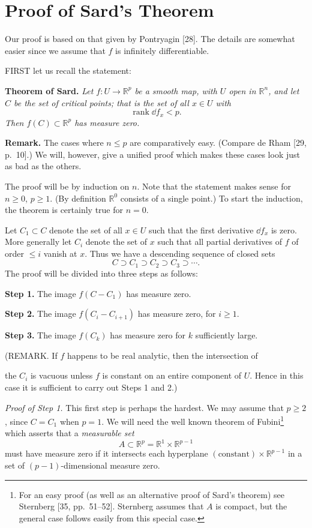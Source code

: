 
\section{Proof of Sard's Theorem}

Our proof is based on that given by Pontryagin [28]. The details are somewhat easier since we assume that $f$ is infinitely differentiable.

FIRST let us recall the statement:

\noindent\textbf{Theorem of Sard.} \textit{Let $f : U \to \mathbb{R}^p$ be a smooth map, with $U$ open in $\mathbb{R}^n$, and let $C$ be the set of critical points; that is the set of all $x \in U$ with}
\[
\operatorname{rank} \dd f_x < p.
\]
\textit{Then $f(C) \subset \mathbb{R}^p$ has measure zero.}

\noindent\textbf{Remark.} The cases where $n \leq p$ are comparatively easy. (Compare de Rham [29, p.~10].) We will, however, give a unified proof which makes these cases look just as bad as the others.

The proof will be by induction on $n$. Note that the statement makes sense for $n \geq 0$, $p \geq 1$. (By definition $\mathbb{R}^0$ consists of a single point.) To start the induction, the theorem is certainly true for $n = 0$.

Let $C_1 \subset C$ denote the set of all $x \in U$ such that the first derivative $\dd f_x$ is zero. More generally let $C_i$ denote the set of $x$ such that all partial derivatives of $f$ of order $\leq i$ vanish at $x$. Thus we have a descending sequence of closed sets
\[
C \supset C_1 \supset C_2 \supset C_3 \supset \cdots.
\]
The proof will be divided into three steps as follows:

\noindent\textbf{Step 1.} The image $f(C - C_1)$ has measure zero.

\noindent\textbf{Step 2.} The image $f(C_i - C_{i+1})$ has measure zero, for $i \geq 1$.

\noindent\textbf{Step 3.} The image $f(C_k)$ has measure zero for $k$ sufficiently large.

(REMARK. If $f$ happens to be real analytic, then the intersection of



the $C_i$ is vacuous unless $f$ is constant on an entire component of $U$. Hence in this case it is sufficient to carry out Steps 1 and 2.)

\noindent\textit{Proof of Step 1.} This first step is perhaps the hardest. We may assume that $p \geq 2$, since $C = C_1$ when $p = 1$. We will need the well known theorem of Fubini\footnote{For an easy proof (as well as an alternative proof of Sard's theorem) see Sternberg [35, pp.~51--52]. Sternberg assumes that $A$ is compact, but the general case follows easily from this special case.} which asserts that a \emph{measurable set}
\[
A \subset \mathbb{R}^p = \mathbb{R}^1 \times \mathbb{R}^{p-1}
\]
must have measure zero if it intersects each hyperplane $(\text{constant}) \times \mathbb{R}^{p-1}$ in a set of $(p-1)$-dimensional measure zero.

